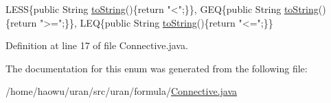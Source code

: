 \begin{DoxyCode}
    LESS\{\textcolor{keyword}{public} String \hyperlink{enumuran_1_1formula_1_1_connective_a90aafb9dc47b7700e3717c06f4c568c2}{toString}()\{\textcolor{keywordflow}{return} \textcolor{stringliteral}{"<"};\}\},
    GEQ\{\textcolor{keyword}{public} String \hyperlink{enumuran_1_1formula_1_1_connective_a90aafb9dc47b7700e3717c06f4c568c2}{toString}()\{\textcolor{keywordflow}{return} \textcolor{stringliteral}{">="};\}\},    
    LEQ\{\textcolor{keyword}{public} String \hyperlink{enumuran_1_1formula_1_1_connective_a90aafb9dc47b7700e3717c06f4c568c2}{toString}()\{\textcolor{keywordflow}{return} \textcolor{stringliteral}{"<="};\}\}
\end{DoxyCode}


Definition at line 17 of file Connective.\+java.



The documentation for this enum was generated from the following file\+:\begin{DoxyCompactItemize}
\item 
/home/haowu/uran/src/uran/formula/\hyperlink{_connective_8java}{Connective.\+java}\end{DoxyCompactItemize}
